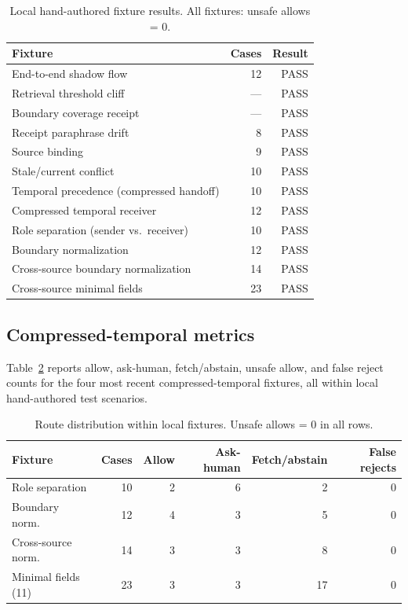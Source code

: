 \documentclass[11pt]{article}
\begin{document}
\begin{table}[h]
\centering
\caption{Local hand-authored fixture results. All fixtures: unsafe allows = 0.}
\label{tab:fixtures}
\begin{tabularx}{\textwidth}{@{}Xrr@{}}
\toprule
\textbf{Fixture} & \textbf{Cases} & \textbf{Result} \\
\midrule
End-to-end shadow flow & 12 & PASS \\
Retrieval threshold cliff & --- & PASS \\
Boundary coverage receipt & --- & PASS \\
Receipt paraphrase drift & 8 & PASS \\
Source binding & 9 & PASS \\
Stale/current conflict & 10 & PASS \\
Temporal precedence (compressed handoff) & 10 & PASS \\
Compressed temporal receiver & 12 & PASS \\
Role separation (sender vs.\ receiver) & 10 & PASS \\
Boundary normalization & 12 & PASS \\
Cross-source boundary normalization & 14 & PASS \\
Cross-source minimal fields & 23 & PASS \\
\bottomrule
\end{tabularx}
\end{table}

\subsection{Compressed-temporal metrics}

Table~\ref{tab:metrics} reports allow, ask-human, fetch/abstain, unsafe allow, and
false reject counts for the four most recent compressed-temporal fixtures, all within
local hand-authored test scenarios.

\begin{table}[h]
\centering
\caption{Route distribution within local fixtures. Unsafe allows = 0 in all rows.}
\label{tab:metrics}
\begin{tabular}{@{}lrrrrr@{}}
\toprule
\textbf{Fixture} & \textbf{Cases} & \textbf{Allow} & \textbf{Ask-human} &
\textbf{Fetch/abstain} & \textbf{False rejects} \\
\midrule
Role separation       & 10 & 2 & 6 & 2  & 0 \\
Boundary norm.        & 12 & 4 & 3 & 5  & 0 \\
Cross-source norm.    & 14 & 3 & 3 & 8  & 0 \\
Minimal fields (11)   & 23 & 3 & 3 & 17 & 0 \\
\bottomrule
\end{tabular}
\end{table}
\end{document}

